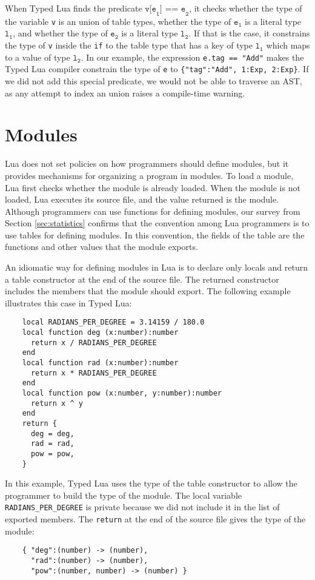 When Typed Lua finds the predicate $\texttt{v[e}_{\texttt{1}}\texttt{] == e}_{\texttt{2}}$,
it checks whether the type of the variable \texttt{v} is an union of table types,
whether the type of $\texttt{e}_{\texttt{1}}$ is a literal type $\texttt{l}_{\texttt{1}}$,
and whether the type of $\texttt{e}_{\texttt{2}}$ is a literal type $\texttt{l}_{\texttt{2}}$.
If that is the case, it constrains the type of \texttt{v} inside
the \texttt{if} to the table type that has a key of type
$\texttt{l}_{\texttt{1}}$ which maps to a value of type $\texttt{l}_{\texttt{2}}$.
In our example, the expression \texttt{e.tag == "Add"} makes the Typed Lua
compiler constrain the type of \texttt{e} to \texttt{\{"tag":"Add", 1:Exp, 2:Exp\}}.
If we did not add this special predicate, we would not be able to traverse an AST,
as any attempt to index an union raises a compile-time warning.

\section{Modules}
\label{sec:modules}

Lua does not set policies on how programmers should define modules,
but it provides mechanisms for organizing a program in modules.
To load a module, Lua first checks whether the module is already loaded.
When the module is not loaded, Lua executes its source file, and
the value returned is the module.
Although programmers can use functions for defining modules,
our survey from Section \ref{sec:statistics} confirms that
the convention among Lua programmers is to use tables for defining modules. 
In this convention, the fields of the table are the functions and other
values that the module exports.

An idiomatic way for defining modules in Lua is to declare only locals
and return a table constructor at the end of the source file.
The returned constructor includes the members that the module should export.
The following example illustrates this case in Typed Lua:
\begin{verbatim}
    local RADIANS_PER_DEGREE = 3.14159 / 180.0
    local function deg (x:number):number
      return x / RADIANS_PER_DEGREE
    end
    local function rad (x:number):number
      return x * RADIANS_PER_DEGREE
    end
    local function pow (x:number, y:number):number
      return x ^ y
    end
    return {
      deg = deg,
      rad = rad,
      pow = pow,
    }
\end{verbatim}

In this example, Typed Lua uses the type of the table constructor
to allow the programmer to build the type of the module.
The local variable \texttt{RADIANS\string_PER\string_DEGREE}
is private because we did not include it in the list of exported members. 
The \texttt{return} at the end of the source file gives the type of the module:
\begin{verbatim}
    { "deg":(number) -> (number),
      "rad":(number) -> (number),
      "pow":(number, number) -> (number) }
\end{verbatim}

